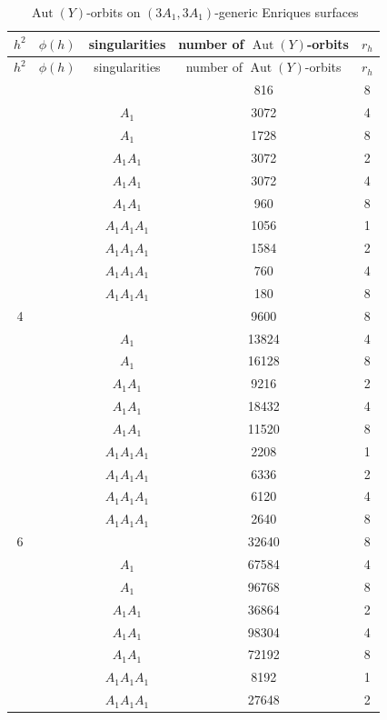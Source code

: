 \documentclass{amsart}
\theoremstyle{definition}
\theoremstyle{plain}
\DeclareMathOperator{\Aut}{Aut}
\begin{document}
\renewcommand{\arraystretch}{1.3}
 \begin{longtable}{ccccc}
 \caption{$\Aut(Y)$-orbits on $(3A_1,3A_1)$-generic Enriques surfaces}\\
\toprule
$h^2$ &$\phi(h)$&  singularities & number of $\Aut(Y)$-orbits & $r_h$\\
\hline
  \endfirsthead
 \toprule
$h^2$ &$\phi(h)$&  singularities & number of $\Aut(Y)$-orbits & $r_h$ \\
\hline
\endhead
 \endfoot
 \endlastfoot
2 & & \(\) &816 & 8 \\
 & & \(A_{1} \) &3072 & 4 \\
 & & \(A_{1} \) &1728 & 8 \\
 & & \(A_{1} A_{1} \) &3072 & 2 \\
 & & \(A_{1} A_{1} \) &3072 & 4 \\
 & & \(A_{1} A_{1} \) &960 & 8 \\
 & & \(A_{1} A_{1} A_{1} \) &1056 & 1 \\
 & & \(A_{1} A_{1} A_{1} \) &1584 & 2 \\
 & & \(A_{1} A_{1} A_{1} \) &760 & 4 \\
 & & \(A_{1} A_{1} A_{1} \) &180 & 8 \\
4 & & \(\) &9600 & 8 \\
 & & \(A_{1} \) &13824 & 4 \\
 & & \(A_{1} \) &16128 & 8 \\
 & & \(A_{1} A_{1} \) &9216 & 2 \\
 & & \(A_{1} A_{1} \) &18432 & 4 \\
 & & \(A_{1} A_{1} \) &11520 & 8 \\
 & & \(A_{1} A_{1} A_{1} \) &2208 & 1 \\
 & & \(A_{1} A_{1} A_{1} \) &6336 & 2 \\
 & & \(A_{1} A_{1} A_{1} \) &6120 & 4 \\
 & & \(A_{1} A_{1} A_{1} \) &2640 & 8 \\
6 & & \(\) &32640 & 8 \\
 & & \(A_{1} \) &67584 & 4 \\
 & & \(A_{1} \) &96768 & 8 \\
 & & \(A_{1} A_{1} \) &36864 & 2 \\
 & & \(A_{1} A_{1} \) &98304 & 4 \\
 & & \(A_{1} A_{1} \) &72192 & 8 \\
 & & \(A_{1} A_{1} A_{1} \) &8192 & 1 \\
 & & \(A_{1} A_{1} A_{1} \) &27648 & 2 \\

\end{longtable}
\end{document}

